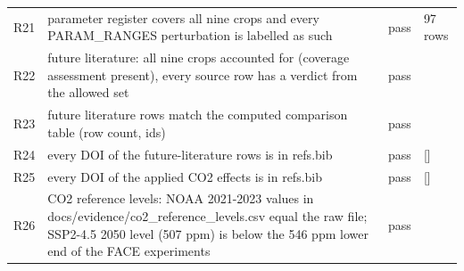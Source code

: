 \begin{longtable}{@{}lp{9.0cm}lp{3.8cm}@{}}
R21 & parameter register covers all nine crops and every PARAM\_RANGES perturbation is labelled as such & pass & 97 rows \\
R22 & future literature: all nine crops accounted for (coverage assessment present), every source row has a verdict from the allowed set & pass &  \\
R23 & future literature rows match the computed comparison table (row count, ids) & pass &  \\
R24 & every DOI of the future-literature rows is in refs.bib & pass & [] \\
R25 & every DOI of the applied CO2 effects is in refs.bib & pass & [] \\
R26 & CO2 reference levels: NOAA 2021-2023 values in docs/evidence/co2\_reference\_levels.csv equal the raw file; SSP2-4.5 2050 level (507 ppm) is below the 546 ppm lower end of the FACE experiments & pass &  \\
\end{longtable}

